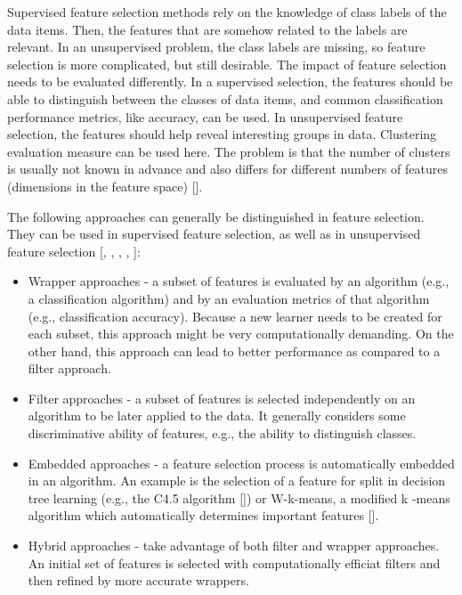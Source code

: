 Supervised feature selection methods rely on the knowledge of class labels of the data items. Then, the features that are somehow related to the labels are relevant. In an unsupervised problem, the class labels are missing, so feature selection is more complicated, but still desirable. The impact of feature selection needs to be evaluated differently. In a supervised selection, the features should be able to distinguish between the classes of data items, and common classification performance metrics, like accuracy, can be used. In unsupervised feature selection, the features should help reveal interesting groups in data. Clustering evaluation measure can be used here. The problem is that the number of clusters is usually not known in advance and also differs for different numbers of features (dimensions in the feature space) [\cite{ref78}].

The following approaches can generally be distinguished in feature selection. They can be used in supervised feature selection, as well as in unsupervised feature selection [\cite{ref47}, \cite{ref159}, \cite{ref137}, \cite{ref78}, \cite{ref119}]:

\begin{itemize}
  \item Wrapper approaches - a subset of features is evaluated by an algorithm (e.g., a classification algorithm) and by an evaluation metrics of that algorithm (e.g., classification accuracy). Because a new learner needs to be created for each subset, this approach might be very computationally demanding. On the other hand, this approach can lead to better performance as compared to a filter approach.
  \item Filter approaches - a subset of features is selected independently on an algorithm to be later applied to the data. It generally considers some discriminative ability of features, e.g., the ability to distinguish classes.
  \item Embedded approaches - a feature selection process is automatically embedded in an algorithm. An example is the selection of a feature for split in decision tree learning (e.g., the C4.5 algorithm [\cite{ref220}]) or W-k-means, a modified k -means algorithm which automatically determines important features [\cite{ref121}].
  \item Hybrid approaches - take advantage of both filter and wrapper approaches. An initial set of features is selected with computationally efficiat filters and then refined by more accurate wrappers.
\end{itemize}

